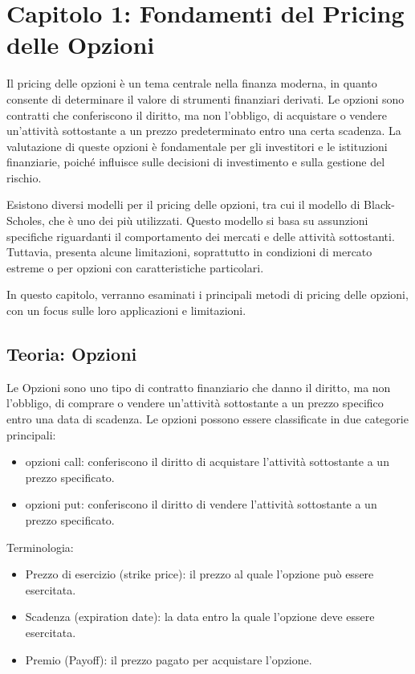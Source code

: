 \documentclass[12pt,a4paper]{report}
\begin{document}
\newpage
\section{Capitolo 1: Fondamenti del Pricing delle Opzioni}

Il pricing delle opzioni è un tema centrale nella finanza moderna, in quanto consente di determinare il valore di strumenti finanziari derivati. Le opzioni sono contratti che conferiscono il diritto, ma non l'obbligo, di acquistare o vendere un'attività sottostante a un prezzo predeterminato entro una certa scadenza. La valutazione di queste opzioni è fondamentale per gli investitori e le istituzioni finanziarie, poiché influisce sulle decisioni di investimento e sulla gestione del rischio.

Esistono diversi modelli per il pricing delle opzioni, tra cui il modello di Black-Scholes, che è uno dei più utilizzati. Questo modello si basa su assunzioni specifiche riguardanti il comportamento dei mercati e delle attività sottostanti. Tuttavia, presenta alcune limitazioni, soprattutto in condizioni di mercato estreme o per opzioni con caratteristiche particolari.

In questo capitolo, verranno esaminati i principali metodi di pricing delle opzioni, con un focus sulle loro applicazioni e limitazioni.

\subsection{Teoria: Opzioni}
Le Opzioni sono uno tipo di contratto finanziario che danno il diritto, ma non l'obbligo, di comprare o vendere un'attività sottostante a un prezzo specifico entro una data di scadenza. Le opzioni possono essere classificate in due categorie principali:

\begin{itemize}
    \item opzioni call: conferiscono il diritto di acquistare l'attività sottostante a un prezzo specificato.
    \item opzioni put: conferiscono il diritto di vendere l'attività sottostante a un prezzo specificato.
\end{itemize}

Terminologia:
\begin{itemize}
    \item Prezzo di esercizio (strike price): il prezzo al quale l'opzione può essere esercitata.
    \item Scadenza (expiration date): la data entro la quale l'opzione deve essere esercitata.
    \item Premio (Payoff): il prezzo pagato per acquistare l'opzione.
\end{itemize}
\end{document}
